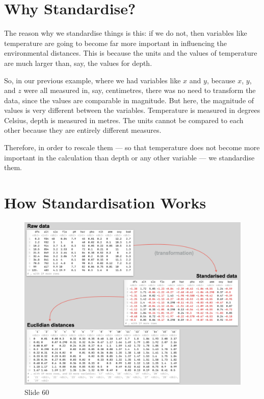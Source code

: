 \documentclass[
  10pt,
]{book}
\begin{document}
\section{Why Standardise?}\label{why-standardise}

The reason why we standardise things is this: if we do not, then
variables like temperature are going to become far more important in
influencing the environmental distances. This is because the units and
the values of temperature are much larger than, say, the values for
depth.

So, in our previous example, where we had variables like \(x\) and
\(y\), because \(x\), \(y\), and \(z\) were all measured in, say,
centimetres, there was no need to transform the data, since the values
are comparable in magnitude. But here, the magnitude of values is very
different between the variables. Temperature is measured in degrees
Celsius, depth is measured in metres. The units cannot be compared to
each other because they are entirely different measures.

Therefore, in order to rescale them --- so that temperature does not
become more important in the calculation than depth or any other
variable --- we standardise them.

\section{How Standardisation Works}\label{how-standardisation-works}

\begin{figure}[ht]
\centering
\includegraphics[width=0.8\linewidth]{../images/BDC334/BDC334-060.jpeg}
\caption*{Slide 60}
\end{figure}
\end{document}
